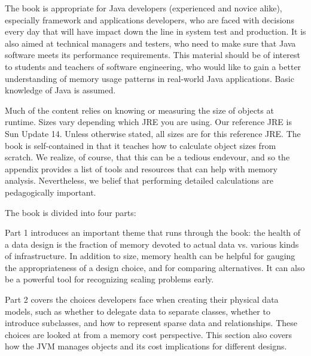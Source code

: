 
The book is appropriate for Java developers (experienced and novice alike),
especially framework and applications developers, who are faced with decisions
every day that will have impact down the line in system test and production. It
is also aimed at technical managers and testers, who need to make sure that Java
software meets its performance requirements.  This material should be of
interest to students and teachers of software engineering, who would like to
gain a better understanding of memory usage patterns in real-world Java
applications. Basic knowledge of Java is assumed.

Much of the content relies on knowing or measuring the size of objects at
runtime. Sizes vary depending which JRE you are using. Our reference JRE is Sun
\javasix Update 14. Unless otherwise stated, all sizes are for this reference
JRE. The book is self-contained in that it teaches how to calculate object sizes
from scratch. We realize, of course, that this can be a tedious endevour, and so
the appendix provides a list of tools and resources that can help with memory
analysis. Nevertheless, we belief that performing detailed calculations are
pedagogically important.


The book is divided into four parts:

Part 1 introduces an important theme that runs through the book: the health of a
data design is the fraction of memory devoted to actual data vs. various kinds
of infrastructure. In addition to size, memory health can be helpful for gauging
the appropriateness of a design choice, and for comparing alternatives. It can
also be a powerful tool for recognizing scaling problems early.

Part 2 covers the choices developers face when creating their physical data
models, such as whether to delegate data to separate classes, whether to
introduce subclasses, and how to represent sparse data and relationships. These
choices are looked at from a memory cost perspective. This section also covers
how the JVM manages objects and its cost implications for different designs.
  
